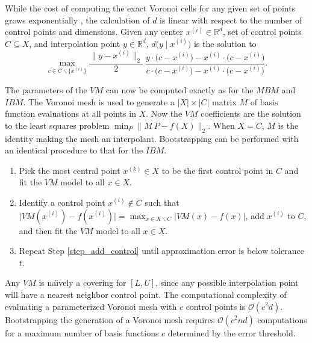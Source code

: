 While the cost of computing the exact Voronoi cells for any given set of points grows exponentially \cite{dutour2009complexity}, the calculation of $d$ is linear with respect to the number of control points and dimensions. Given any center $x^{(i)} \in \mathbb{R}^d$, set of control points $C \subseteq X$, and interpolation point $y \in \mathbb{R}^d$, $d\bigl(y \mid x^{(i)}\bigr)$ is the solution to
\begin{equation}
  \max_{c \in C\backslash\{x^{(i)}\}} \frac{\bigl\|y - x^{(i)}\bigr\|_2}{2} \ \frac{y \cdot \bigl(c - x^{(i)}\bigr) - x^{(i)} \cdot \bigl(c - x^{(i)}\bigr)}{c \cdot \bigl(c - x^{(i)}\bigr) - x^{(i)} \cdot \bigl(c - x^{(i)}\bigr)}.
\end{equation}

The parameters of the $VM$ can now be computed exactly as for the $MBM$ and $IBM$. The Voronoi mesh is used to generate a $|X| \times |C|$ matrix $M$ of basis function evaluations at all points in $X$. Now the $VM$ coefficients are the solution to the least squares problem $\min_P \bigl\| M \ P - f(X) \bigr\|_2$. When $X = C$, $M$ is the identity making the mesh an interpolant. Bootstrapping can be performed with an identical procedure to that for the $IBM$.
\begin{enumerate}
\item Pick the most central point $x^{(k)} \in X$ to be the first control point in $C$ and fit the $VM$ model to all $x \in X$.
\item Identify a control point $x^{(i)} \notin C$ such that $\bigl| VM(x^{(i)}) - f(x^{(i)}) \bigr| = \max_{x \in X \backslash C} \bigl| VM(x) - f(x) \bigr|$, add $x^{(i)}$ to $C$, and then fit the $VM$ model to all $x \in X$. \label{step_add_control}
\item Repeat Step \ref{step_add_control} until approximation error is below tolerance $t$.
\end{enumerate}

Any $VM$ is na\"{\i}vely a covering for $[L,U]$, since any possible interpolation point will have a nearest neighbor control point. The computational complexity of evaluating a parameterized Voronoi mesh with $c$ control points is $\mathcal{O}(c^2 d)$. Bootstrapping the generation of a Voronoi mesh requires $\mathcal{O}(c^2 n d)$ computations for a maximum number of basis functions $c$ determined by the error threshold.




